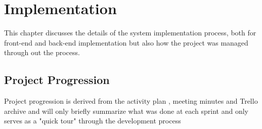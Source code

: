 
\chapter{Implementation}

This chapter discusses the details of the system implementation process, both for front-end and back-end implementation but also how the project was managed through out the process.


\section{Project Progression}
Project progression is derived from the activity plan , meeting minutes  and Trello archive   and will only briefly summarize what was done at each sprint and only serves as a "quick tour" through the development process  

